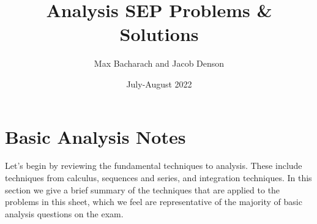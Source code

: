 \documentclass[answers]{exam}
\title{Analysis SEP Problems \& Solutions}
\date{July-August 2022}
\author{Max Bacharach and Jacob Denson}
\theoremstyle{problemstyle}
\newcommand{\1}[1]{\textbf{1}_{\left[#1\right]}} %
\begin{document}
\maketitle

\tableofcontents

\newpage

\section{Basic Analysis Notes}

Let's begin by reviewing the fundamental techniques to analysis. These include techniques from calculus, sequences and series, and integration techniques. In this section we give a brief summary of the techniques that are applied to the problems in this sheet, which we feel are representative of the majority of basic analysis questions on the exam.
\end{document}
